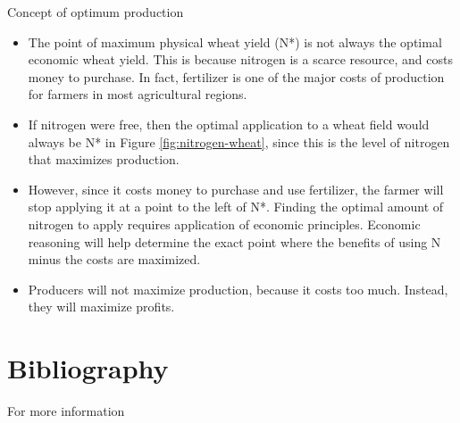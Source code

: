 \documentclass[12pt,ignorenonframetext,aspectratio=169]{beamer}
\providecommand{\tightlist}{%
  \setlength{\itemsep}{0pt}\setlength{\parskip}{0pt}}
\begin{document}
\begin{frame}{Concept of optimum production}
\protect\hypertarget{concept-of-optimum-production}{}
\begin{itemize}
\tightlist
\item
  The point of maximum physical wheat yield (N*) is not always the
  optimal economic wheat yield. This is because nitrogen is a scarce
  resource, and costs money to purchase. In fact, fertilizer is one of
  the major costs of production for farmers in most agricultural
  regions.
\item
  If nitrogen were free, then the optimal application to a wheat field
  would always be N* in Figure \ref{fig:nitrogen-wheat}, since this is
  the level of nitrogen that maximizes production.
\item
  However, since it costs money to purchase and use fertilizer, the
  farmer will stop applying it at a point to the left of N*. Finding the
  optimal amount of nitrogen to apply requires application of economic
  principles. Economic reasoning will help determine the exact point
  where the benefits of using N minus the costs are maximized.
\item
  Producers will not maximize production, because it costs too much.
  Instead, they will maximize profits.
\end{itemize}
\end{frame}

\hypertarget{bibliography}{%
\section{Bibliography}\label{bibliography}}

\begin{frame}{For more information}
\protect\hypertarget{for-more-information}{}
\end{frame}
\end{document}

